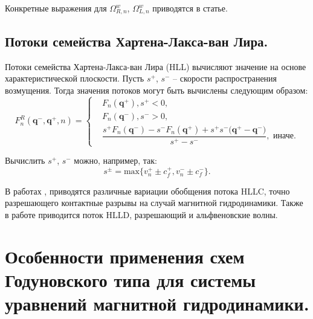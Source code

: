 \documentclass[14pt, a4paper, fleqn]{extreport}
\begin{document}
    Конкретные выражения для $\Omega_{R,n}^w$, $\Omega_{L,n}^w$ приводятся в статье.
    
    \subsection{Потоки семейства Хартена-Лакса-ван Лира.}
    
    Потоки семейства Хартена-Лакса-ван Лира (HLL)
    вычисляют значение на основе характеристической плоскости.
    Пусть $s^{+}$, $s^{-}$ -- скорости распространения возмущения.
    Тогда значения потоков могут быть вычислены следующим образом:
    \begin{equation*}
        F_{n}^R(\textbf{q}^{-},\textbf{q}^{+},n) = 
        \begin{cases}
            &F_n(\textbf{q}^{+}), s^{+} < 0, \\
            &F_n(\textbf{q}^{-}), s^{-} > 0, \\
            &\dfrac{ s^{+}F_n(\textbf{q}^{-}) -
                     s^{-}F_n(\textbf{q}^{+}) + 
                     s^{+}s^{-}\big( \textbf{q}^{+} - \textbf{q}^{-} \big)}{ s^{+}-s^{-} }, \text{ иначе}.
        \end{cases}
    \end{equation*}
    
    Вычислить $s^{+}$, $s^{-}$ можно, например, так:
    \begin{equation*}
        s^{\pm} = \text{max}\big\lbrace v_n^{+} \pm c_f^{+}, v_n^{-} \pm c_f^{-} \big\rbrace.
    \end{equation*}
    
    В работах \cite{ShengtaiLi}, \cite{MIYOSHI2005315} 
    приводятся различные вариации обобщения потока HLLC, 
    точно разрешающего контактные разрывы на случай магнитной гидродинамики.
    Также в работе \cite{MIYOSHI2005315} приводится поток HLLD, разрешающий и альфвеновские волны.
    
        
    \section{Особенности применения схем Годуновского типа для системы уравнений 
             магнитной гидродинамики.}
    
\end{document}
